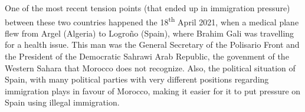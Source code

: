 \documentclass[../my_knowledge.tex]{subfiles}
\begin{document}
One of the most recent tension points (that ended up in immigration pressure) between these two countries happened the 18\textsuperscript{th} April 2021, when a medical plane flew from Argel (Algeria) to Logro\~no (Spain), where Brahim Gali was travelling for a health issue. This man was the General Secretary of the Polisario Front and the President of the Democratic Sahrawi Arab Republic, the govenment of the Western Sahara that Morocco does not recognize. Also, the political situation of Spain, with many political parties with very different positions regarding immigration plays in favour of Morocco, making it easier for it to put pressure on Spain using illegal immigration.
\end{document}
